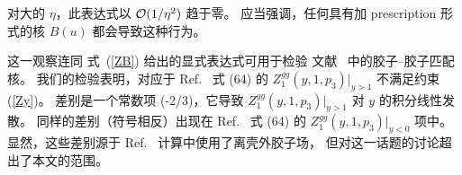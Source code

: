 对大的 $\eta$，此表达式以 ${\cal O}(1/\eta^2)$ 趋于零。
应当强调，任何具有加 prescription 形式的核 $B(u)$ 都会导致这种行为。

这一观察连同 \mbox{式 (\ref{ZB})}
给出的显式表达式可用于检验
\mbox{文献 \cite{Wang:2017qyg,Wang:2019tgg}} 中的胶子--胶子匹配核。
我们的检验表明，对应于 Ref.~\cite{Wang:2019tgg}
式 (64) 的 $Z_1^{gg} (y, 1, p_3) |_{y>1}$ 不满足约束 (\ref{Zy})。
差别是一个常数项 (-2/3)，它导致
$Z_1^{gg} (y, 1, p_3) |_{y>1}$ 对 \mbox{$y$} 的积分线性发散。
同样的差别（符号相反）出现在 Ref.~\cite{Wang:2019tgg} 式 (64) 的
$Z_1^{gg} (y, 1, p_3) |_{y<0}$ 项中。
显然，这些差别源于 Ref.~\cite{Wang:2019tgg} 计算中使用了离壳外胶子场，
但对这一话题的讨论超出了本文的范围。
